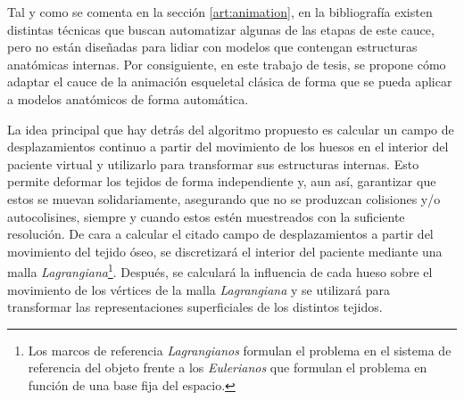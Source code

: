Tal y como se comenta en la sección \ref{art:animation}, en la bibliografía existen distintas técnicas que buscan automatizar algunas de las etapas de este cauce, pero no están diseñadas para lidiar con modelos que contengan estructuras anatómicas internas. Por consiguiente, en este trabajo de tesis, se propone cómo adaptar el cauce de la animación esqueletal clásica de forma que se pueda aplicar a modelos anatómicos de forma automática. 

La idea principal que hay detrás del algoritmo propuesto es calcular un campo de desplazamientos continuo a partir del movimiento de los huesos
en el interior del paciente virtual y utilizarlo para transformar sus estructuras internas. Esto permite deformar los tejidos de forma independiente y, aun así, garantizar que estos se muevan solidariamente, asegurando que no se produzcan colisiones y/o autocolisines, siempre y cuando estos estén muestreados con la suficiente resolución. 
%
De cara a calcular el citado campo de desplazamientos a partir del movimiento del tejido óseo, se discretizará el interior del paciente mediante una malla \emph{Lagrangiana}\footnote{Los marcos de referencia \emph{Lagrangianos} formulan el problema en el sistema de referencia del objeto frente a los \emph{Eulerianos} que formulan el problema en función de una base fija del espacio.}. Después, se calculará la influencia de cada hueso sobre el movimiento de los vértices de la malla \emph{Lagrangiana} y  se utilizará para transformar las representaciones superficiales de los distintos tejidos. 


